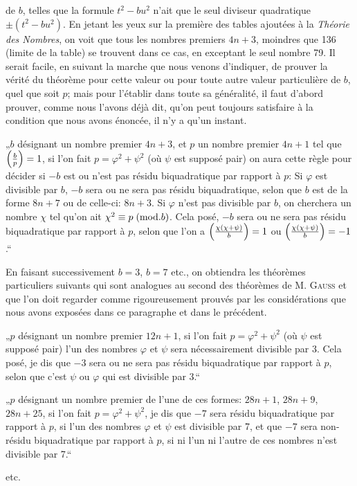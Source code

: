 \par\noindent
de $b$, telles que la formule $t^2-bu^2$ n'ait que le seul diviseur quadratique $\pm(t^2-bu^2)$.
En jetant les yeux sur la première des tables ajoutées à la \emph{Théorie des Nombres}, on voit
que tous les nombres premiers $4n+3$, moindres que 136 (limite de la table) se trouvent dans ce
cas, en exceptant le seul nombre 79. Il serait facile, en suivant la marche que nous venons
d'indiquer, de prouver la vérité du théorème pour cette valeur ou pour toute autre valeur
particulière de $b$, quel que soit $p$; mais pour l'établir dans toute sa généralité, il faut
d'abord prouver, comme nous l'avons déjà dit, qu'on peut toujours satisfaire à la condition que
nous avons énoncée, il n'y a qu'un instant.
\par\indent
„$b$ désignant un nombre premier $4n+3$, et $p$ un nombre premier $4n+1$ tel que $\left(\frac{b}{p}\right)=1$,
si l'on fait $p=\varphi^2+\psi^2$ (où $\psi$ est supposé pair) on aura cette règle pour décider si
$-b$ est ou n'est pas résidu biquadratique par rapport à $p$: Si $\varphi$ est divisible par $b$,
$-b$ sera ou ne sera pas résidu biquadratique, selon que $b$ est de la forme $8n+7$ ou de
celle-ci: $8n+3$. Si $\varphi$ n'est pas divisible par $b$, on cherchera un nombre $\chi$ tel
qu'on ait $\chi^2\equiv p\;(\mathrm{mod}.b)$. Cela posé, $-b$ sera ou ne sera pas résidu biquadratique par
rapport à $p$, selon que l'on a $\left(\frac{\chi(\chi+\psi)}{b}\right)=1$ ou $\left(\frac{\chi(\chi+\psi)}{b}\right)=-1$.“
\par\indent
En faisant successivement $b=3$, $b=7$ etc., on obtiendra les théorèmes particuliers suivants qui
sont analogues au second des théorèmes de M. \textsc{Gauss} et que l'on doit regarder comme
rigoureusement prouvés par les considérations que nous avons exposées dans ce paragraphe et dans
le précédent.
\par\indent
„$p$ désignant un nombre premier $12n+1$, si l'on fait $p=\varphi^2+\psi^2$ (où $\psi$ est supposé
pair) l'un des nombres $\varphi$ et $\psi$ sera nécessairement divisible par 3. Cela posé, je dis
que $-3$ sera ou ne sera pas résidu biquadratique par rapport à $p$, selon que c'est $\psi$ ou
$\varphi$ qui est divisible par 3.“
\par\indent
„$p$ désignant un nombre premier de l'une de ces formes: $28n+1$, $28n+9$, $28n+25$, si l'on fait
$p=\varphi^2+\psi^2$, je dis que $-7$ sera résidu biquadratique par rapport à $p$, si l'un des
nombres $\varphi$ et $\psi$ est divisible par 7, et que $-7$ sera non-résidu biquadratique par
rapport à $p$, si ni l'un ni l'autre de ces nombres n'est divisible par 7.“
\par\indent
etc.
